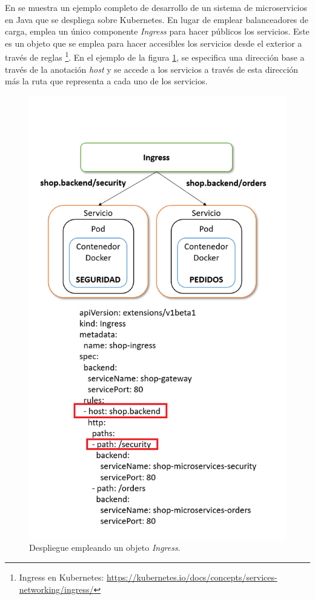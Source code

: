 \documentclass[11pt,spanish,listoffigures]{tfgetsinf}
\begin{document}
En \cite{Minkowski2018} se muestra un ejemplo completo de desarrollo de un sistema de microservicios en Java que se despliega sobre Kubernetes. En lugar de emplear balanceadores de carga, emplea un único componente \textit{Ingress} para hacer públicos los servicios. Este es un objeto que se emplea para hacer accesibles los servicios desde el exterior a través de reglas \footnote{Ingress en Kubernetes: \url{https://kubernetes.io/docs/concepts/services-networking/ingress/}}. En el ejemplo de la figura \ref{fig:Ingress}, se especifica una dirección base a través de la anotación \textit{host} y se accede a los servicios a través de esta dirección más la ruta que representa a cada uno de los servicios.

\begin{figure}[h]
\centering
\includegraphics[scale=0.7]{Ingress}
\caption{Despliegue empleando un objeto \textit{Ingress}.}
\label{fig:Ingress}
\end{figure}
\end{document}
